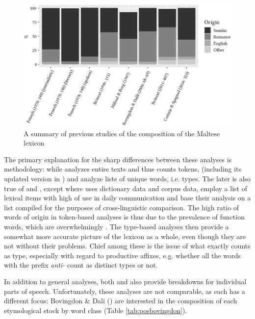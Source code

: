 \documentclass[output=paper]{langsci/langscibook}
\begin{document}
\begin{figure}[H]
\centering
\includegraphics[width=12cm,trim=0 20 0 0]{figures/lexiconnewfont.eps}
\caption{A summary of previous studies of the composition of the Maltese lexicon}
\label{lexiconfig}
\end{figure}

The primary explanation for the sharp differences between these analyses is methodology: while \cite{fenech1978} analyzes entire texts and thus counts tokens, \cite{brincat1996} (including its updated version in \citealt{brincat2011}) and \cite{bovingdondalli2006} analyze lists of unique words, i.e. types. The later is also true of \cite{mifsudborg1997} and \cite{comriespagnol2016}, except where \cite{brincat1996} uses dictionary data and \cite{bovingdondalli2006} corpus data, \cite{mifsudborg1997} employ a list of lexical items with high  of use in daily communication and \cite{comriespagnol2016} base their analysis on a list compiled for the purposes of cross-linguistic comparison. The high ratio of words of  origin in token-based analyses is thus due to the prevalence of function words, which are overwhelmingly . The type-based analyses then provide a somewhat more accurate picture of the lexicon as a whole, even though they are not without their problems. Chief among these is the issue of what exactly counts as type, especially with regard to productive  affixes, e.g. whether all the words with the prefix \textit{anti-} count as distinct types or not.


In addition to general analyses, both \cite{bovingdondalli2006} and \cite{comriespagnol2016} also provide breakdowns for individual parts of speech. Unfortunately, these analyses are not comparable, as each has a different focus: Bovingdon \& Dali (\citeyear[71]{bovingdondalli2006}) are interested in the composition of each etymological stock by word class (Table \ref{tab:posbovingdon}).
\end{document}

